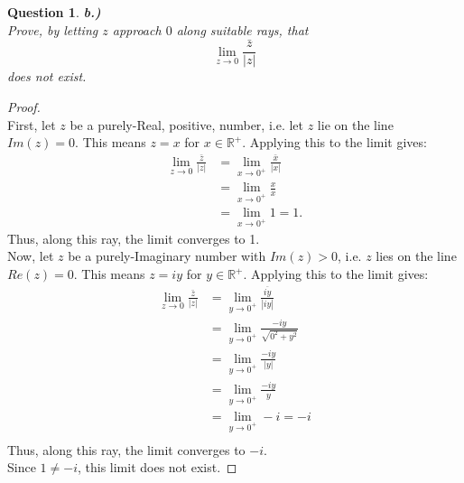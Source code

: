 \documentclass[10pt,a4paper]{article}
\newtheorem*{question*}{Question}
\begin{document}
\begin{question*}{\textbf{b.)}}
\\Prove, by letting $z$ approach $0$ along suitable rays, that
\[\lim_{z \to 0} \frac{\bar{z}}{|z|}\]
does not exist.
\end{question*}

\begin{proof}{$ $}
\\First, let $z$ be a purely-Real, positive, number, i.e. let $z$ lie on the line $Im(z) = 0$. This means $z = x$ for $x \in \mathbb{R}^+$. Applying this to the limit gives:
\begin{align*}
\lim_{z \to 0} \frac{\bar{z}}{|z|} &= \lim_{x \to 0^+} \frac{\bar{x}}{|x|}\\
&= \lim_{x \to 0^+} \frac{x}{x}\\
&= \lim_{x \to 0^+} 1 = 1.
\end{align*}
Thus, along this ray, the limit converges to 1.\\
Now, let $z$ be a purely-Imaginary number with $Im(z) > 0$, i.e. $z$ lies on the line $Re(z) = 0$. This means $z = iy$ for $y \in \mathbb{R}^+$. Applying this to the limit gives:
\begin{align*}
\lim_{z \to 0} \frac{\bar{z}}{|z|} &= \lim_{y \to 0^+} \frac{\overline{iy}}{|iy|}\\
&= \lim_{y \to 0^+} \frac{-iy}{\sqrt{0^2 + y^2}}\\
&= \lim_{y \to 0^+} \frac{-iy}{|y|}\\
&= \lim_{y \to 0^+} \frac{-iy}{y}\\
&= \lim_{y \to 0^+} -i = -i\\
\end{align*}
Thus, along this ray, the limit converges to $-i$.\\
Since $1 \neq -i$, this limit does not exist. 
\end{proof}
\end{document}
